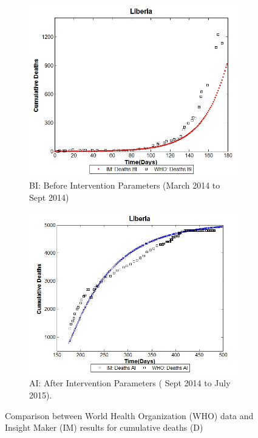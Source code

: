 \begin{figure}[h!]
 \centering 
 \begin{subfigure}[b]{0.38\textwidth}
  \includegraphics[width=\textwidth]{LB_BI_SD_WHO_IM} \caption{BI: Before Intervention Parameters (March 2014  to Sept 2014)} \label{fig:LB_BI_SD_WHO_IM} \end{subfigure}
 \hspace{.1cm}
\begin{subfigure}[b]{0.38\textwidth}
 \includegraphics[width=\textwidth]{LB_AI_SD_WHO_IM} \caption{AI: After Intervention Parameters  ( Sept 2014 to July 2015).} \label{fig:LB_AI_SD_WHO_IM} \end{subfigure} 
\caption{Comparison between World Health Organization (WHO) data and Insight Maker (IM) results for cumulative deaths (D)}
\label{fig:LB_IM_WHO} 
\end{figure}




